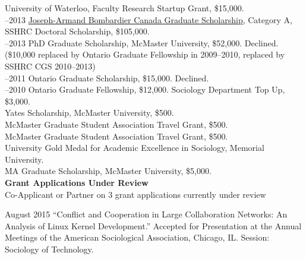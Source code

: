 \documentclass[9pt,usenames,dvipsnames]{article}
\begin{document}
 University of Waterloo, Faculty Research Startup Grant, \$15,000. \\

–2013 \href{http://www.sshrc-crsh.gc.ca/funding-financement/programs-programmes/fellowships/doctoral-doctorat-eng.aspx}{Joseph-Armand Bombardier Canada Graduate Scholarship}, Category A, SSHRC Doctoral Scholarship, \$105,000.\\

–2013 PhD Graduate Scholarship, McMaster University, \$52,000. Declined. (\$10,000 replaced by Ontario Graduate Fellowship in 2009–2010, replaced by SSHRC CGS 2010–2013)\\

–2011 Ontario Graduate Scholarship, \$15,000. Declined.\\

–2010 Ontario Graduate Fellowship, \$12,000. Sociology Department Top Up, \$3,000.\\

 Yates Scholarship, McMaster University, \$500.\\

 McMaster Graduate Student Association Travel Grant, \$500.\\

 McMaster Graduate Student Association Travel Grant, \$500.\\

 University Gold Medal for Academic Excellence in Sociology, Memorial University.\\

 MA Graduate Scholarship, McMaster University, \$5,000.\\

\noindent \textbf{Grant Applications Under Review} \\

\ind Co-Applicant or Partner on 3 grant applications currently under review \\ 


\ind August 2015 ``Conflict and Cooperation in Large Collaboration Networks: An Analysis of Linux Kernel Development.'' Accepted for Presentation at the Annual Meetings of the American Sociological Association, Chicago, IL. Session: Sociology of Technology. \\
\end{document}
